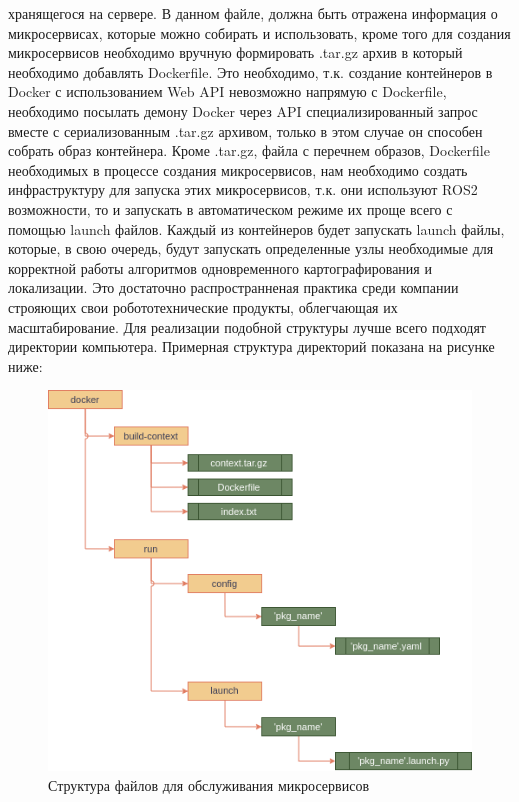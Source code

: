 \documentclass[a4paper, 14pt]{extreport}
\begin{document}
хранящегося на сервере. В данном файле, должна быть отражена информация о микросервисах, которые можно собирать и использовать, кроме 
того для создания микросервисов необходимо вручную формировать .tar.gz архив в который необходимо добавлять Dockerfile. Это необходимо,
т.к. создание контейнеров в Docker с использованием Web API невозможно напрямую с Dockerfile, необходимо посылать демону Docker через 
API специализированный запрос вместе с сериализованным .tar.gz архивом, только в этом случае он способен собрать образ контейнера.
Кроме .tar.gz, файла с перечнем образов, Dockerfile необходимых в процессе создания микросервисов, нам необходимо создать инфраструктуру 
для запуска этих микросервисов, т.к. они используют ROS2 возможности, то и запускать в автоматическом режиме их проще всего с помощью
launch файлов. Каждый из контейнеров будет запускать launch файлы, которые, в свою очередь, будут запускать определенные узлы
необходимые для корректной работы алгоритмов одновременного картографирования и локализации. Это достаточно распространненая практика 
среди компании строяющих свои робототехнические продукты, облегчающая их масштабирование. Для реализации подобной структуры лучше всего 
подходят директории компьютера. Примерная структура директорий показана на рисунке ниже:
\begin{figure}[ht]
\begin{center}
\includegraphics[scale = 0.6]{./figure/docker_folder_schema}
\caption{Структура файлов для обслуживания микросервисов}
\label{fig:manip_photo}
\end{center}
\end{figure}
\end{document}
